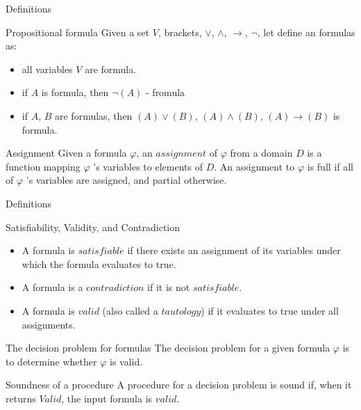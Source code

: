 \documentclass[mathserif]{beamer}
\begin{document}
\begin{frame}{Definitions}
\begin{block}{Propositional formula}
Given a set $V$, brackets, $\vee$, $\wedge$, $\rightarrow$, $\lnot$, let define an formulas as:
\begin{itemize}
\item all variables $V$ are formula.
\item if $A$ is formula, then $\lnot(A)$ - fromula
\item if $A$, $B$ are formulas, then $(A)\vee(B)$, $(A)\wedge(B)$, $(A)\rightarrow(B)$ is formula.
\end{itemize}
\end{block}
\begin{block}{Assignment}
Given a formula $\varphi$, an $assignment$ of $\varphi$ from a domain $D$ is a function mapping $\varphi$ 's variables to elements of $D$. An assignment to $\varphi$ is full if all of $\varphi$ 's variables are assigned, and partial otherwise.
\end{block}
\end{frame}

\begin{frame}{Definitions}
\begin{block}{Satisfiability, Validity, and Contradiction}
\begin{itemize}
\item A formula is $satisfiable$ if there exists an assignment of its variables under which the formula evaluates to true.
\item A formula is a $contradiction$ if it is not $satisfiable$.
\item A formula is $valid$ (also called a $tautology$) if it evaluates to true under all assignments.
\end{itemize}
\end{block}
\begin{block}{The decision problem for formulas}
The decision problem for a given formula $\varphi$ is to determine whether $\varphi$ is valid.
\end{block}
\begin{block}{Soundness of a procedure}
A procedure for a decision problem is sound if, when it returns $Valid$, the input formula is $valid$.
\end{block}
\end{frame}
\end{document}
